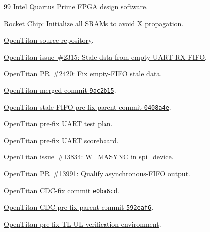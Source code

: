 \documentclass[conference]{IEEEtran}
\begin{document}
\begin{thebibliography}{99}
\href{https://www.intel.com/content/www/us/en/docs/programmable/683472/24-3/design-suite-overview.html}{Intel Quartus Prime FPGA design software}.

\href{https://github.com/chipsalliance/rocket-chip/commit/1cb2d1d7b7191aff8f8004b9b64a5d908c96fd6b}{Rocket Chip: Initialize all SRAMs to avoid X propagation}.

\href{https://github.com/lowRISC/opentitan}{OpenTitan source repository}.

\href{https://github.com/lowRISC/opentitan/issues/2315}{OpenTitan issue~\#2315: Stale data from empty UART RX FIFO}.

\href{https://github.com/lowRISC/opentitan/pull/2420}{OpenTitan PR~\#2420: Fix empty-FIFO stale data}.

\href{https://github.com/lowRISC/opentitan/commit/9ac2b15f162cc4bf5e6e4226ae659c9d4225e1d0}{OpenTitan merged commit \texttt{9ac2b15}}.

\href{https://github.com/lowRISC/opentitan/commit/0408a4e7564c0fde1bf7dca87e8c8e1bce587c75}{OpenTitan stale-FIFO pre-fix parent commit \texttt{0408a4e}}.

\href{https://github.com/lowRISC/opentitan/blob/0408a4e7564c0fde1bf7dca87e8c8e1bce587c75/hw/ip/uart/data/uart_testplan.hjson}{OpenTitan pre-fix UART test plan}.

\href{https://github.com/lowRISC/opentitan/blob/0408a4e7564c0fde1bf7dca87e8c8e1bce587c75/hw/ip/uart/dv/env/uart_scoreboard.sv}{OpenTitan pre-fix UART scoreboard}.

\href{https://github.com/lowRISC/opentitan/issues/13834}{OpenTitan issue~\#13834: W\_MASYNC in spi\_device}.

\href{https://github.com/lowRISC/opentitan/pull/13991}{OpenTitan PR~\#13991: Qualify asynchronous-FIFO output}.

\href{https://github.com/lowRISC/opentitan/commit/e0ba6cdb527c02b7e85dff048a8f168a6e166999}{OpenTitan CDC-fix commit \texttt{e0ba6cd}}.

\href{https://github.com/lowRISC/opentitan/commit/592eaf648de3fdc0803761f9fb31390012587573}{OpenTitan CDC pre-fix parent commit \texttt{592eaf6}}.

\href{https://github.com/lowRISC/opentitan/blob/592eaf648de3fdc0803761f9fb31390012587573/hw/ip/tlul/doc/dv/index.md}{OpenTitan pre-fix TL-UL verification environment}.


\end{thebibliography}
\end{document}
